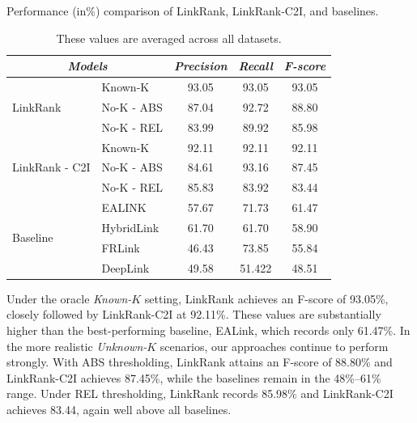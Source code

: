 \begin{table}[htbp]
\centering
\caption{Performance (in\%) comparison of LinkRank, LinkRank-C2I, and baselines. }
\caption*{These values are averaged across all datasets.}
\renewcommand{\arraystretch}{1.2}
\label{rq3}
\scriptsize
\begin{tabular}{llccc}
\toprule
\multicolumn{2}{c}{\textit{\textbf{Models}}} & \textit{\textbf{Precision}} & \textit{\textbf{Recall}} & \textit{\textbf{F-score}} \\
\midrule

\multirow{3}{*}{LinkRank} 
 & Known-K     & 93.05 & 93.05 & 93.05 \\
 & No-K - ABS  & 87.04 & 92.72 & 88.80 \\
 & No-K - REL  & 83.99 & 89.92 & 85.98 \\
\midrule

\multirow{3}{*}{LinkRank - C2I} 
 & Known-K     & 92.11 & 92.11 & 92.11 \\
 & No-K - ABS  & 84.61 & 93.16 & 87.45 \\
 & No-K - REL  & 85.83 & 83.92 & 83.44 \\
\midrule



\multirow{4}{*}{Baseline} 
 & EALINK\cite{ealink}     & 57.67 & 71.73 & 61.47 \\
 & HybridLink\cite{q2}  & 61.70 & 61.70 & 58.90 \\
 & FRLink\cite{r56}      & 46.43 & 73.85 & 55.84 \\
 & DeepLink\cite{q1}   & 49.58 & 51.422 & 48.51 \\
\bottomrule
\end{tabular}
\end{table}

Under the oracle \textit{Known-$K$} setting, LinkRank achieves an F-score of 93.05\%, closely followed by LinkRank-C2I at 92.11\%. These values are substantially higher than the best-performing baseline, EALink, which records only 61.47\%. In the more realistic \textit{Unknown-$K$} scenarios, our approaches continue to perform strongly. With ABS thresholding, LinkRank attains an F-score of 88.80\% and LinkRank-C2I achieves 87.45\%, while the baselines remain in the 48\%--61\% range. Under REL thresholding, LinkRank records 85.98\% and LinkRank-C2I achieves 83.44, again well above all baselines.\\

